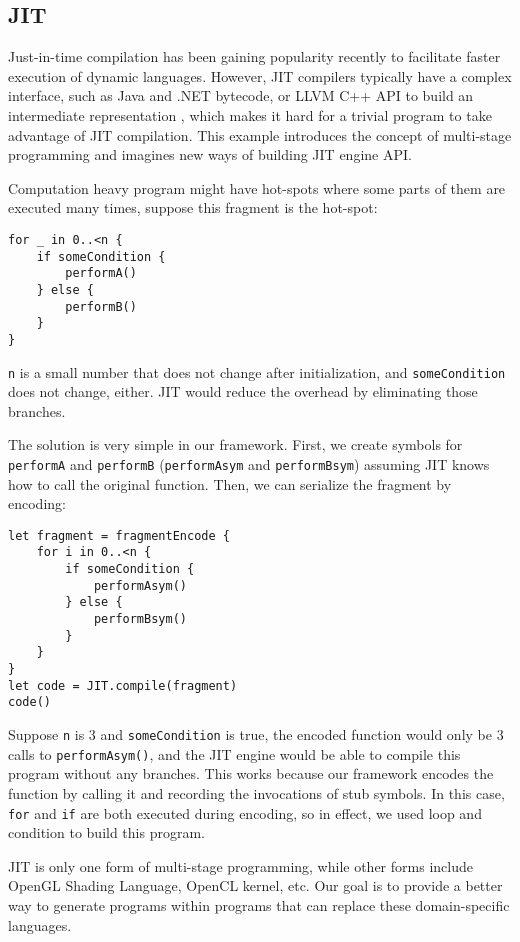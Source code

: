 \documentclass[12pt]{article}
\begin{document}
\subsection{JIT}
Just-in-time compilation has been gaining popularity recently to facilitate faster execution of dynamic languages. However, JIT compilers typically have a complex interface, such as Java and .NET bytecode, or LLVM C++ API to build an intermediate representation \cite{llvm}, which makes it hard for a trivial program to take advantage of JIT compilation. This example introduces the concept of multi-stage programming \cite{msp} and imagines new ways of building JIT engine API.

Computation heavy program might have hot-spots where some parts of them are executed many times, suppose this fragment is the hot-spot:
\begin{lstlisting}
for _ in 0..<n {
    if someCondition {
        performA()
    } else {
        performB()
    }
}
\end{lstlisting}
\texttt{n} is a small number that does not change after initialization, and \texttt{someCondition} does not change, either. JIT would reduce the overhead by eliminating those branches.

The solution is very simple in our framework. First, we create symbols for \texttt{performA} and \texttt{performB} (\texttt{performAsym} and \texttt{performBsym}) assuming JIT knows how to call the original function. Then, we can serialize the fragment by encoding:
\begin{lstlisting}
let fragment = fragmentEncode {
    for i in 0..<n {
        if someCondition {
            performAsym()
        } else {
            performBsym()
        }
    }
}
let code = JIT.compile(fragment)
code()
\end{lstlisting}
Suppose \texttt{n} is 3 and \texttt{someCondition} is true, the encoded function would only be 3 calls to \texttt{performAsym()}, and the JIT engine would be able to compile this program without any branches. This works because our framework encodes the function by calling it and recording the invocations of stub symbols. In this case, \texttt{for} and \texttt{if} are both executed during encoding, so in effect, we used loop and condition to build this program.

JIT is only one form of multi-stage programming, while other forms include OpenGL Shading Language, OpenCL kernel, etc. Our goal is to provide a better way to generate programs within programs that can replace these domain-specific languages.
\end{document}
